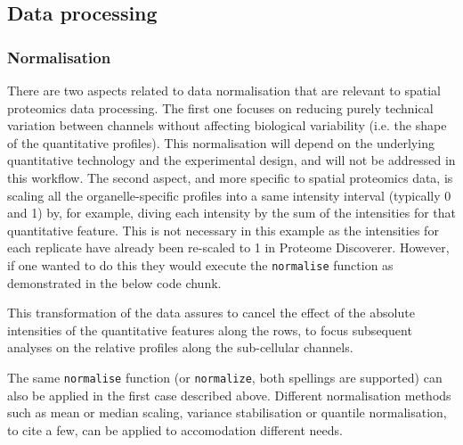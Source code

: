 \subsection*{Data processing}

\subsubsection*{Normalisation}

There are two aspects related to data normalisation that are relevant
to spatial proteomics data processing. The first one focuses on
reducing purely technical variation between channels without
affecting biological variability (i.e. the shape of the quantitative
profiles). This normalisation will depend on the underlying
quantitative technology and the experimental design, and will not be
addressed in this workflow. The second aspect, and more specific to
spatial proteomics data, is scaling all the organelle-specific
profiles into a same intensity interval (typically 0 and 1) by, for
example, diving each intensity by the sum of the intensities for that
quantitative feature. This is not necessary in this example as the
intensities for each replicate have already been re-scaled to 1 in
Proteome Discoverer. However, if one wanted to do this they would
execute the \texttt{normalise} function as demonstrated in the below code
chunk.

\begin{knitrout}
\color{fgcolor}\begin{kframe}
\begin{alltt}
 \hlkwb{<-}   \hlstd{=} \hlstd{)}
\end{alltt}
\end{kframe}
\end{knitrout}

This transformation of the data assures to cancel the effect of the
absolute intensities of the quantitative features along the rows, to
focus subsequent analyses on the relative profiles along the
sub-cellular channels.

The same \texttt{normalise} function (or \texttt{normalize}, both spellings are
supported) can also be applied in the first case described above.
Different normalisation methods such as mean or median scaling,
variance stabilisation or quantile normalisation, to cite a few, can
be applied to accomodation different needs.

